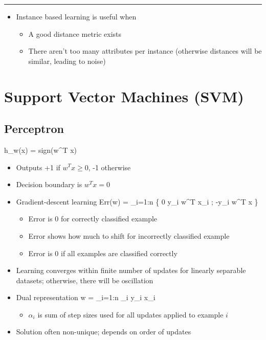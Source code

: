\documentclass[12pt]{article}
\newcommand{\divider}[0]{\par\textcolor{lightgray}{\rule{\textwidth}{0.1pt}}}
\newenvironment{eqn}{\equation\alignedat{3}}{\endalignedat\endequation}
\begin{document}
\divider

\begin{itemize}
	\item Instance based learning is useful when
	\begin{itemize}
		\item A good distance metric exists 
		\item There aren't too many attributes per instance (otherwise distances will be similar, leading to noise)
	\end{itemize}
\end{itemize}

\section{Support Vector Machines (SVM)}

\subsection{Perceptron}

\begin{eqn}
	h_w(x) = sign(w^T x)
\end{eqn}

\begin{itemize}
	\item Outputs +1 if $w^T x \ge 0$, -1 otherwise
	\item Decision boundary is $w^T x = 0$
	\item Gradient-descent learning
	\begin{eqn}
		Err(w) = \Sigma_{i=1:n} \left\{ 0  y_i w^T x_i ; -y_i w^T x  \right\}
	\end{eqn}
	\begin{itemize}
		\item Error is 0 for correctly classified example
		\item Error shows how much to shift for incorrectly classified example
		\item Error is 0 if all examples are classified correctly
	\end{itemize}
	\item Learning converges within finite number of updates for linearly separable datasets; otherwise, there will be oscillation
	\item Dual representation
	\begin{eqn}
		w = \Sigma_{i=1:n} \alpha_i y_i x_i
	\end{eqn}
	\begin{itemize}
		\item $\alpha_i$ is sum of step sizes used for all updates applied to example $i$
	\end{itemize}
	\item Solution often non-unique; depends on order of updates
\end{itemize}
\end{document}
